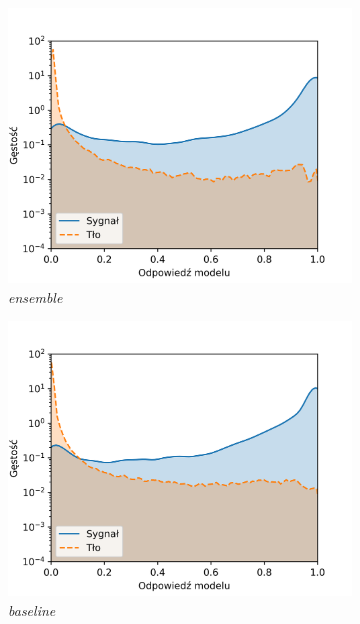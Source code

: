 \documentclass{pracalicmgr}
\begin{document}
	\begin{figure}[H]
	\begin{subfigure}{.5\textwidth}
	\centering
	\includegraphics[width=1\textwidth]{density_ensemble.png}
	\caption{\textit{ensemble}}
	\end{subfigure}
	\begin{subfigure}{.5\textwidth}
	\centering
	\includegraphics[width=1\textwidth]{density_baseline.png}
	\caption{\textit{baseline}}
	\end{subfigure}
	\begin{subfigure}{.5\textwidth}
	\centering

\end{subfigure}
\end{figure}
\end{document}
